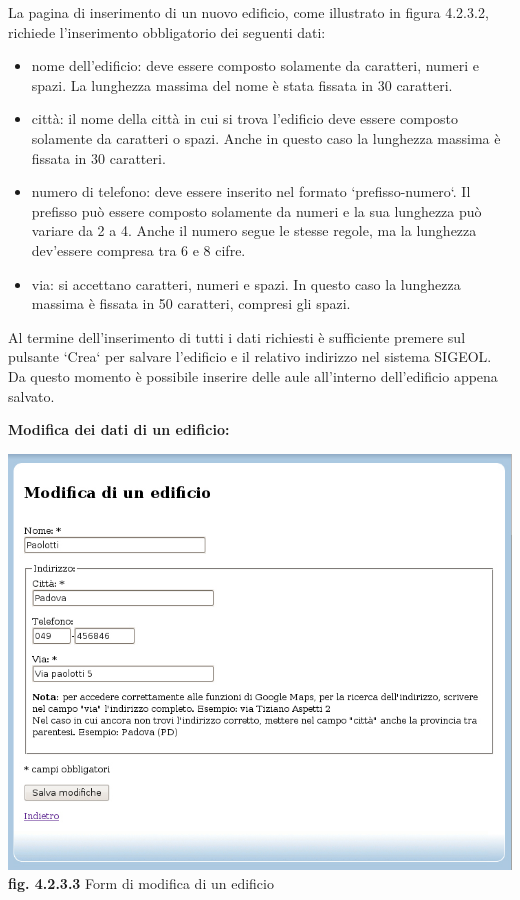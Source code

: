 \documentclass[11pt,a4paper]{article}
\begin{document}
La pagina di inserimento di un nuovo edificio, come illustrato in figura 4.2.3.2, richiede l'inserimento obbligatorio dei seguenti dati:
\begin{itemize}
 \item nome dell'edificio: deve essere composto solamente da caratteri, numeri e spazi. La lunghezza massima del nome è stata fissata in 30 caratteri.
 \item città: il nome della città in cui si trova l'edificio deve essere composto solamente da caratteri o spazi. Anche in questo caso la lunghezza massima è fissata in 30 caratteri.
 \item numero di telefono: deve essere inserito nel formato `prefisso-numero`. Il prefisso può essere composto solamente da numeri e la sua lunghezza può variare da 2 a 4. Anche il numero segue le stesse regole, ma la lunghezza dev'essere compresa tra 6 e 8 cifre.
 \item via: si accettano caratteri, numeri e spazi. In questo caso la lunghezza massima è fissata in 50 caratteri, compresi gli spazi.
\end{itemize}
Al termine dell'inserimento di tutti i dati richiesti è sufficiente premere sul pulsante `Crea` per salvare l'edificio e il relativo indirizzo nel sistema SIGEOL.
Da questo momento è possibile inserire delle aule all'interno dell'edificio appena salvato.
\newline \newline \newline
\begin{large}\textbf{Modifica dei dati di un edificio:}\end{large}
\bigskip
\begin{center}
	\includegraphics[scale=0.5]{images/modifica_edificio.jpg}\\
	\textbf{fig. 4.2.3.3} Form di modifica di un edificio\\
\end{center}
\bigskip
\end{document}
